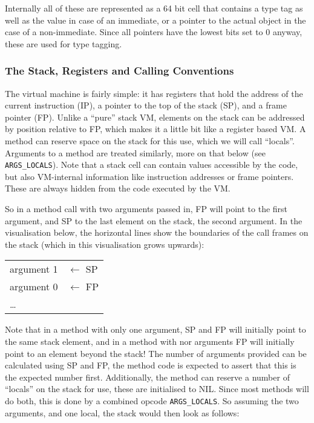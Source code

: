 \documentclass[12pt,a4paper]{article}
\begin{document}

Internally all of these are represented as a 64 bit cell that contains a type tag as well as the value in case of an immediate, or a pointer to the actual object in the case of a non-immediate. Since all pointers have the lowest bits set to 0 anyway, these are used for type tagging.

\subsubsection{The Stack, Registers and Calling Conventions}\label{sec:stack}

The virtual machine is fairly simple: it has registers that hold the address of the current instruction (IP), a pointer to the top of the stack (SP), and a frame pointer (FP). Unlike a ``pure'' stack VM, elements on the stack can be addressed by position relative to FP, which makes it a little bit like a
register based VM. A method can reserve space on the stack for this use, which we will call ``locals''. Arguments to a method are treated similarly, more on that below (see \verb|ARGS_LOCALS|). Note that a stack cell can contain values accessible by the code, but also VM-internal information like instruction addresses or frame pointers. These are always hidden from the code executed by the VM.

So in a method call with two arguments passed in, FP will point to the first argument, and SP to the last element on the stack, the second argument. In the visualisation below, the horizontal lines show the boundaries of the call frames on the stack (which in this visualisation grows upwards):

\begin{table}[H]
\centering
\begin{tabular}{|p{3cm}|p{3cm}}
argument 1 & $\leftarrow$ SP \\
argument 0 & $\leftarrow$ FP \\
\cline{1-1}
\ldots & \\
\end{tabular}
\end{table}

Note that in a method with only one argument, SP and FP will initially point to the same stack element, and in a method with nor arguments FP will initially point to an element beyond the stack! The number of arguments provided can be calculated using SP and FP, the method code is expected to assert that this is the expected number first. Additionally, the method can reserve a number of ``locals'' on the stack for use, these are initialised to NIL. Since most methods will do both, this is done by a combined opcode \verb|ARGS_LOCALS|. So assuming the two arguments, and one local, the stack would then look as follows:
\end{document}
